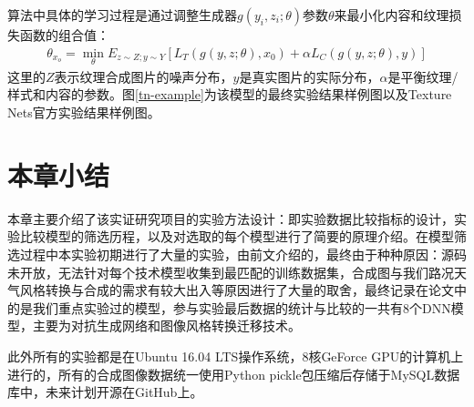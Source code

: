 算法中具体的学习过程是通过调整生成器$g(y_i,z_i;\theta)$参数$\theta$来最小化内容和纹理损失函数的组合值：
\begin{align}
    \theta_{x_o}=\min_{\theta}E_{z\sim Z;y\sim Y}[L_T(g(y,z;\theta),x_0)+\alpha L_C(g(y,z;\theta),y)]
\end{align}
这里的$Z$表示纹理合成图片的噪声分布，$y$是真实图片的实际分布，$\alpha$是平衡纹理/样式和内容的参数。图\ref{tn-example}为该模型的最终实验结果样例图以及Texture Nets官方实验结果样例图。


\section{本章小结}

本章主要介绍了该实证研究项目的实验方法设计：即实验数据比较指标的设计，实验比较模型的筛选历程，以及对选取的每个模型进行了简要的原理介绍。在模型筛选过程中本实验初期进行了大量的实验，由前文介绍的，最终由于种种原因：源码未开放，无法针对每个技术模型收集到最匹配的训练数据集，合成图与我们路况天气风格转换与合成的需求有较大出入等原因进行了大量的取舍，最终记录在论文中的是我们重点实验过的模型，参与实验最后数据的统计与比较的一共有8个DNN模型，主要为对抗生成网络和图像风格转换迁移技术。

此外所有的实验都是在Ubuntu 16.04 LTS操作系统，8核GeForce GPU的计算机上进行的，所有的合成图像数据统一使用Python pickle包压缩后存储于MySQL数据库中，未来计划开源在GitHub上。


